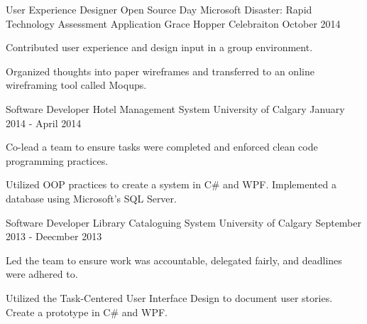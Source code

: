 \begin{cventries}
  \cventry
    {User Experience Designer}
    {Open Source Day Microsoft Disaster: Rapid Technology Assessment Application}
    {Grace Hopper Celebraiton}
    {October 2014}
    {
      \begin{cvitems}
        \item {Contributed user experience and design input in a group environment.}
        \item {Organized thoughts into paper wireframes and transferred to an online wireframing tool called Moqups.}
      \end{cvitems}
    }
  \cventry
    {Software Developer}
    {Hotel Management System}
    {University of Calgary}
    {January 2014 - April 2014}
    {
      \begin{cvitems}
        \item {Co-lead a team to ensure tasks were completed and enforced clean code programming practices.}
        \item {Utilized OOP practices to create a system in C\# and WPF. Implemented a database using Microsoft’s SQL Server.}
      \end{cvitems}
    }
  \cventry
    {Software Developer}
    {Library Cataloguing System}
    {University of Calgary}
    {September 2013 - Deecmber 2013}
    {
      \begin{cvitems}
        \item {Led the team to ensure work was accountable, delegated fairly, and deadlines were adhered to.}
        \item {Utilized the Task-Centered User Interface Design to document user stories. Create a prototype in C\# and WPF.}
      \end{cvitems} 
    }
\end{cventries}
